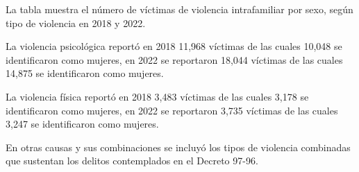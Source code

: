 La tabla muestra el número de víctimas de violencia intrafamiliar por sexo, según tipo de violencia en 2018 y 2022. 

La violencia psicológica reportó en 2018 11,968 víctimas de las cuales 10,048 se identificaron como mujeres, en 2022 se reportaron 18,044 víctimas de las cuales 14,875 se identificaron como mujeres. 

La violencia física reportó en 2018 3,483 víctimas de las cuales 3,178 se identificaron como mujeres, en 2022 se reportaron 3,735 víctimas de las cuales 3,247 se identificaron como mujeres. 

En otras causas y sus combinaciones se incluyó los tipos de violencia combinadas que sustentan los delitos contemplados en el Decreto 97-96.